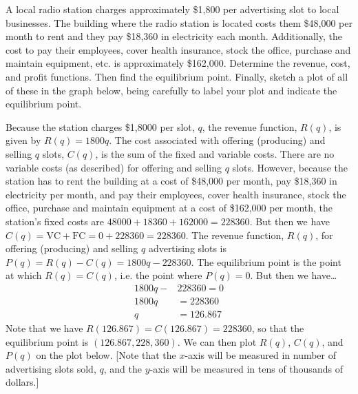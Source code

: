 \documentclass[11pt,letterpaper]{article}
\begin{document}
\newpage



 A local radio station charges approximately \$1,800 per advertising slot to local businesses. The building where the radio station is located costs them \$48,000 per month to rent and they pay \$18,360 in electricity each month. Additionally, the cost to pay their employees, cover health insurance, stock the office, purchase and maintain equipment, etc. is approximately \$162,000. Determine the revenue, cost, and profit functions. Then find the equilibrium point. Finally, sketch a plot of all of these in the graph below, being carefully to label your plot and indicate the equilibrium point. \pspace

\sol Because the station charges \$1,8000 per slot, $q$, the revenue function, $R(q)$, is given by $R(q)= 1800q$. The cost associated with offering (producing) and selling $q$ slots, $C(q)$, is the sum of the fixed and variable costs. There are no variable costs (as described) for offering and selling $q$ slots. However, because the station has to rent the building at a cost of \$48,000 per month, pay \$18,360 in electricity per month, and pay their employees, cover health insurance, stock the office, purchase and maintain equipment at a cost of \$162,000 per month, the station's fixed costs are $48000 + 18360 + 162000= 228360$. But then we have $C(q)= \text{VC} + \text{FC}= 0 + 228360= 228360$. The revenue function, $R(q)$, for offering (producing) and selling $q$ advertising slots is $P(q)= R(q) - C(q)= 1800q - 228360$. The equilibrium point is the point at which $R(q)= C(q)$, i.e. the point where $P(q)= 0$. But then we have\dots
	\[
	\begin{aligned}
	1800q - &228360= 0 \\[0.3cm]
	1800q &= 228360 \\[0.3cm]
	q&= 126.867
	\end{aligned}
	\]
Note that we have $R(126.867)= C(126.867)= 228360$, so that the equilibrium point is $(126.867, 228,360)$. We can then plot $R(q)$, $C(q)$, and $P(q)$ on the plot below. [Note that the $x$-axis will be measured in number of advertising slots sold, $q$, and the $y$-axis will be measured in tens of thousands of dollars.]
\end{document}
